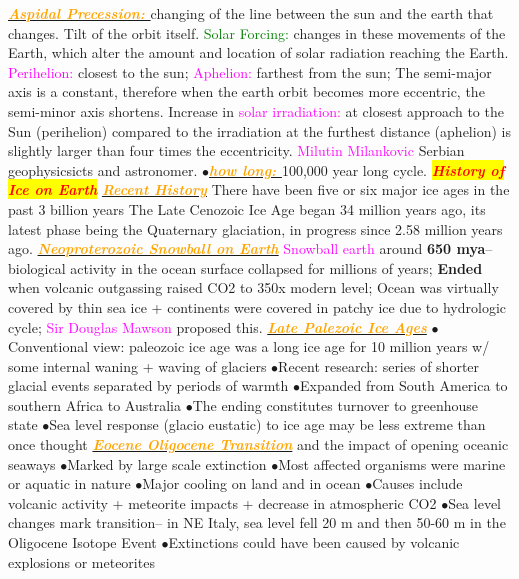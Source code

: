 \documentclass{article}
\newcommand{\ddd}{$\bullet$}
\newcommand{\red}[1]{\textcolor{red}{#1}}
\newcommand{\green}[1]{\textcolor{green}{#1}}
\newcommand{\pink}[1]{\textcolor{magenta}{#1}}
\newcommand{\orange}[1]{\textcolor{orange}{#1}}
\newcommand{\mysection}[1]{\colorbox{yellow}{\textbf{\textit{\red{#1}}}}}
\newcommand{\mysub}[1]{\underline{\textbf{{\textit{\orange{#1}}}}}}
\newcommand{\mysubsub}[1]{{{\green{#1}}}}
\newcommand{\vocab}[1]{{\pink{#1}}}
\begin{document}
\begin{multicols*}{4}
        \mysub{Aspidal Precession: }changing of the line between the sun and the earth that changes. Tilt of the orbit itself. 
        \mysubsub{Solar Forcing: }changes in these movements of the Earth, which alter the amount and location of solar radiation reaching the Earth.
        \vocab{Perihelion: }closest to the sun; \vocab{Aphelion: }farthest from the sun; The semi-major axis is a constant, therefore when the earth orbit becomes more eccentric, the semi-minor axis shortens. Increase in \vocab{solar irradiation: }at closest approach to the Sun (perihelion) compared to the irradiation at the furthest distance (aphelion) is slightly larger than four times the eccentricity.
        \vocab{Milutin Milankovic} Serbian geophysicsicts and astronomer.
        \ddd \mysub{how long: }100,000 year long cycle. 
    \mysection{History of Ice on Earth}
    	\mysub{Recent History}
    	There have been five or six major ice ages in the past 3 billion years
    	The Late Cenozoic Ice Age began 34 million years ago, its latest phase being the Quaternary glaciation, in progress since 2.58 million years ago. 
        \mysub{Neoproterozoic Snowball on Earth} 
            \vocab{Snowball earth} around \textbf{650 mya}--biological activity in the ocean surface collapsed for millions of years; \textbf{Ended} when volcanic outgassing raised CO2 to 350x modern level; Ocean was virtually covered by thin sea ice + continents were covered in patchy ice due to hydrologic cycle; \vocab{Sir Douglas Mawson} proposed this. 
        \mysub{Late Palezoic Ice Ages}
            \ddd Conventional view: paleozoic ice age was a long ice age for 10 million years w/ some internal waning + waving of glaciers
            \ddd Recent research: series of shorter glacial events separated by periods of warmth
            \ddd Expanded from South America to southern Africa to Australia 
            \ddd The ending constitutes turnover to greenhouse state
            \ddd Sea level response (glacio eustatic) to ice age may be less extreme than once thought
        \mysub{Eocene Oligocene Transition} and the impact of opening oceanic seaways
            \ddd Marked by large scale extinction
            \ddd Most affected organisms were marine or aquatic in nature
            \ddd Major cooling on land and in ocean
            \ddd Causes include volcanic activity + meteorite impacts + decrease in atmospheric CO2
            \ddd Sea level changes mark transition-- in NE Italy, sea level fell 20 m and then 50-60 m in the Oligocene Isotope Event
            \ddd Extinctions could have been caused by volcanic explosions or meteorites

\end{multicols*}
\end{document}
